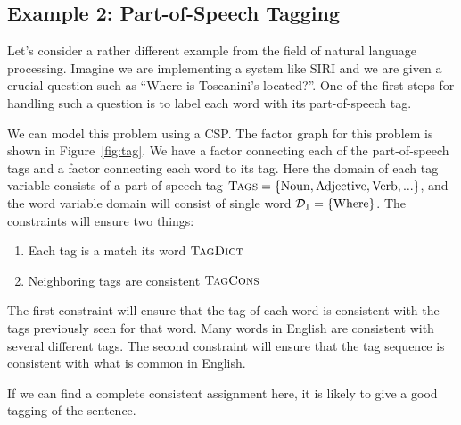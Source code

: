\documentclass[11pt]{article}
\begin{document}
\subsection{Example 2: Part-of-Speech Tagging}

Let's consider a rather different example from the field of natural 
language processing. Imagine we are implementing a system like SIRI
and we are given a crucial question such as ``Where is Toscanini's located?''.
One of the first steps for handling such a question is to label each word 
with its part-of-speech tag. 

We can model this problem using a CSP. The factor graph for this
problem is shown in Figure~\ref{fig:tag}. We have a factor connecting
each of the part-of-speech tags and a factor connecting each word to
its tag.  Here the domain of each tag variable consists of a
part-of-speech tag $\mathrm{\textsc{Tags}} = \{ \mathrm{Noun, Adjective, Verb,
  ... } \}$, and the word variable domain will consist of single word
$\mathcal{D}_1 = \{\mathrm{Where}\}$. The constraints will ensure two things:

\begin{enumerate}
\item Each tag is a match its word $\mathrm{\textsc{TagDict}}$ 
\item Neighboring tags are consistent $\mathrm{\textsc{TagCons}}$
\end{enumerate}

The first constraint will ensure that the tag of each word is consistent
with the tags previously seen for that word. Many words in English are consistent 
with several different tags.  The second constraint will ensure that the 
tag sequence is consistent with what is common in English.

If we can find a complete consistent assignment here, it is likely to
give a good tagging of the sentence.
\end{document}
